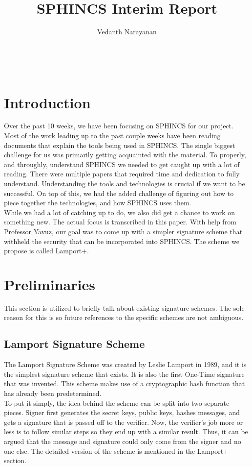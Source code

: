 \documentclass[]{scrartcl}
\title{SPHINCS Interim Report}
\author{Vedanth Narayanan}
\makeatletter
\renewcommand{\maketitle}{ %
	\begin{center} %
		{\LARGE\@title} %
		
		\vspace{15pt} %
		{\large\@author} %
		\\\@date %
		
	\end{center}
}
\makeatother
\begin{document}
\maketitle


\section*{Introduction}
Over the past 10 weeks, we have been focusing on SPHINCS for our project. Most of the work leading up to the past couple weeks have been reading documents that explain the tools being used in SPHINCS. The single biggest challenge for us was primarily getting acquainted with the material. To properly, and throughly, understand SPHINCS we needed to get caught up with a lot of reading. There were multiple papers that required time and dedication to fully understand. Understanding the tools and technologies is crucial if we want to be successful. On top of this, we had the added challenge of figuring out how to piece together the technologies, and how SPHINCS uses them.\\
While we had a lot of catching up to do, we also did get a chance to work on something new. The actual focus is transcribed in this paper. With help from Professor Yavuz, our goal was to come up with a simpler signature scheme that withheld the security that can be incorporated into SPHINCS. The scheme we propose is called Lamport+.

\section*{Preliminaries}
\vspace{-0.3cm}This section is utilized to briefly talk about existing signature schemes. The sole reason for this is so future references to the specific schemes are not ambiguous. 

\subsection*{Lamport Signature Scheme}
The Lamport Signature Scheme was created by Leslie Lamport in 1989, and it is the simplest signature scheme that exists. It is also the first One-Time signature that was invented. This scheme makes use of a cryptographic hash function that has already been predetermined.\\
To put it simply, the idea behind the scheme can be split into two separate pieces. Signer first generates the secret keys, public keys, hashes messages, and gets a signature that is passed off to the verifier. Now, the verifier's job more or less is to follow similar steps so they end up with a similar result. Thus, it can be argued that the message and signature could only come from the signer and no one else. The detailed version of the scheme is mentioned in the Lamport+ section.
\end{document}
